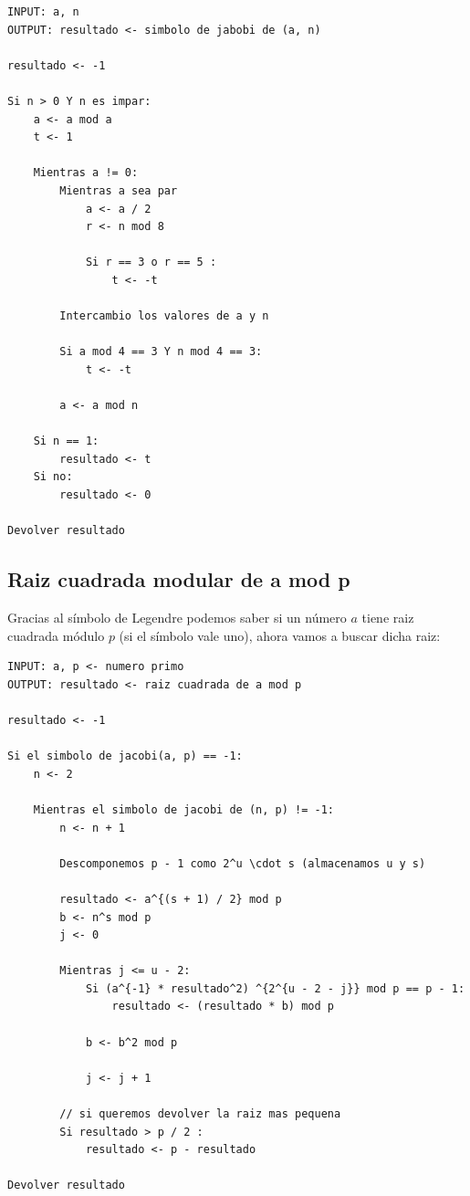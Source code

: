 \documentclass[12pt, spanish]{article}
\begin{document}
\begin{lstlisting}[caption={Símbolo de Jacobi}]
INPUT: a, n
OUTPUT: resultado <- simbolo de jabobi de (a, n)

resultado <- -1

Si n > 0 Y n es impar:
	a <- a mod a
	t <- 1

	Mientras a != 0:
		Mientras a sea par
			a <- a / 2
			r <- n mod 8

			Si r == 3 o r == 5 :
				t <- -t

		Intercambio los valores de a y n

		Si a mod 4 == 3 Y n mod 4 == 3:
			t <- -t

		a <- a mod n

	Si n == 1:
		resultado <- t
	Si no:
		resultado <- 0

Devolver resultado
\end{lstlisting}

\subsection{Raiz cuadrada modular de a mod p}

Gracias al símbolo de Legendre podemos saber si un número $a$ tiene raiz cuadrada módulo $p$ (si el símbolo vale uno), ahora vamos a buscar dicha raiz:


\begin{lstlisting}[caption={Algoritmo para obtener la raiz cuadrada modular}]
INPUT: a, p <- numero primo
OUTPUT: resultado <- raiz cuadrada de a mod p

resultado <- -1

Si el simbolo de jacobi(a, p) == -1:
	n <- 2

	Mientras el simbolo de jacobi de (n, p) != -1:
		n <- n + 1

		Descomponemos p - 1 como 2^u \cdot s (almacenamos u y s)

		resultado <- a^{(s + 1) / 2} mod p
		b <- n^s mod p
		j <- 0

		Mientras j <= u - 2:
			Si (a^{-1} * resultado^2) ^{2^{u - 2 - j}} mod p == p - 1:
				resultado <- (resultado * b) mod p

			b <- b^2 mod p

			j <- j + 1

		// si queremos devolver la raiz mas pequena
		Si resultado > p / 2 :
			resultado <- p - resultado

Devolver resultado
\end{lstlisting}
\end{document}
